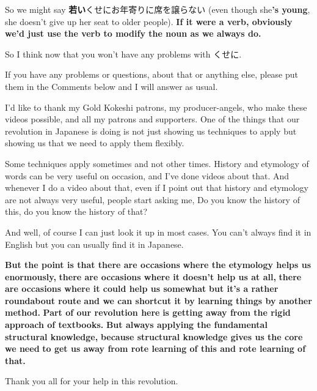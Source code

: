 \thinrule

So we might say {\bf 若い}くせにお年寄りに席を譲らない (even though she{\bf 's young}, she doesn't give up her seat to older people). {\bf If it were a verb, obviously we'd just use the verb to modify the noun as we always do.}

{}

So I think now that you won't have any problems with くせに.

\thinrule

If you have any problems or questions, about that or anything else, please put them in the Comments below and I will answer as usual.

I'd like to thank my Gold Kokeshi patrons, my producer-angels, who make these videos possible, and all my patrons and supporters. One of the things that our revolution in Japanese is doing is not just showing us techniques to apply but showing us that we need to apply them flexibly.

Some techniques apply sometimes and not other times. History and etymology of words can be very useful on occasion, and I've done videos about that. And whenever I do a video about that, even if I point out that history and etymology are not always very useful, people start asking me, Do you know the history of this, do you know the history of that?

And well, of course I can just look it up in most cases. You can't always find it in English but you can usually find it in Japanese.

{\bf But the point is that there are occasions} {\bf where the etymology helps us enormously,} {\bf there are occasions where it doesn't help us at all,} {\bf there are occasions where it could help us somewhat} {\bf but it's a rather roundabout route} {\bf and we can shortcut it by learning things by another method.} {\bf Part of our revolution here} {\bf is getting away from the rigid approach of textbooks.} {\bf But always applying the fundamental structural knowledge,} {\bf because structural knowledge gives us the core we need} {\bf to get us away from rote learning of this and rote learning of that.}

Thank you all for your help in this revolution.

\stopsectionlevel

\stopsectionlevel

